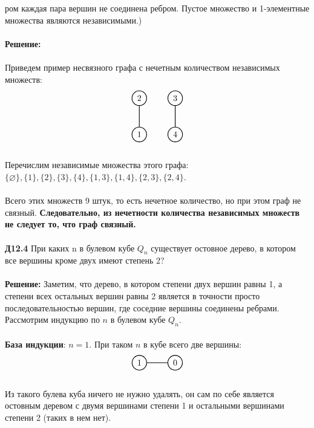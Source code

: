 \documentclass[a4paper, 12pt]{article}
\begin{document}
    ром каждая пара вершин не соединена ребром. Пустое множество и 1-элементные множества являются
    независимыми.)
    \\
    \\ \textbf{Решение: } 
    \\
    \\ Приведем пример несвязного графа с нечетным количеством независимых множеств:
    \\
    \[
        \begin{tikzpicture}[node distance={15mm}, thick, main/.style = {draw, circle}] 
            \node[main] (1) {$1$}; 
            \node[main] (2) [above of=1] {$2$}; 
            \node[main] (3) [right of=2] {$3$}; 
            \node[main] (4) [below of=3] {$4$}; 
            \draw[-] (1) -- (2); 
            \draw[-] (3) -- (4);
          \end{tikzpicture}
    \]
    \\ Перечислим независимые множества этого графа: $\{\varnothing\}, \{1\}, \{2\}, \{3\}, \{4\}, \{1, 3\}, \{1, 4\}, \{2, 3\}, \{2, 4\}$.
    \\
    \\ Всего этих множеств 9 штук, то есть нечетное количество, но при этом граф не связный. \textbf{Следовательно, из нечетности количества независимых множеств не следует то, что граф связный.}
    \\
    \\ \textbf{Д12.4} При каких n в булевом кубе $Q_n$ существует остовное дерево, в котором все вершины кроме двух имеют степень 2?
    \\
    \\ \textbf{Решение: } Заметим, что дерево, в котором степени двух вершин равны 1, а степени всех остальных вершин равны 2 является в точности просто последовательностью вершин, где соседние вершины соединены ребрами. Рассмотрим индукцию по $n$ в булевом кубе $Q_n$.
    \\
    \\ \textbf{База индукции}: $n = 1$. При таком $n$ в кубе всего две вершины:
    \\
    \[
        \begin{tikzpicture}[node distance={15mm}, thick, main/.style = {draw, circle}] 
            \node[main] (1) {$1$}; 
            \node[main] (0) [right of=1] {$0$};  
            \draw[-] (1) -- (0); 
          \end{tikzpicture}
    \]
    \\ Из такого булева куба ничего не нужно удалять, он сам по себе является остовным деревом с двумя вершинами степени 1 и остальными вершинами степени 2 (таких в нем нет).
\end{document}
